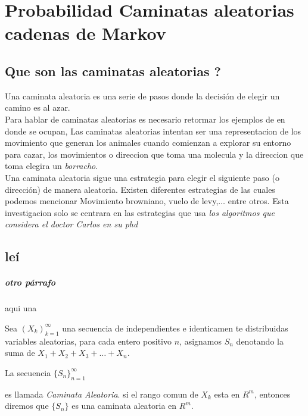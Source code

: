 \chapter{Probabilidad Caminatas aleatorias   cadenas de Markov} %
\label{Chapter1}


\section {Que son las caminatas aleatorias ?}
Una caminata aleatoria es una serie de pasos donde la decisi\'on de
elegir un
camino es al azar.\\
Para hablar de caminatas aleatorias es necesario retormar los ejemplos
de en donde se ocupan, Las caminatas aleatorias intentan ser una
representacion de los movimiento que generan los animales cuando
comienzan a explorar su entorno para cazar, los movimientos o
direccion que toma una molecula y la direccion que toma elegira un
\emph{borracho}.\\

Una caminata aleatoria sigue una estrategia para elegir el siguiente
paso (o direcci\'on) de manera aleatoria. Existen diferentes
estrategias de las cuales podemos mencionar Movimiento browniano,
vuelo de levy,$ \ldots$  entre otros. Esta
investigacion solo se centrara en las estrategias que usa \emph{los
  algoritmos
  que considera el doctor Carlos en su phd } \\


\section{leí}

\paragraph{otro párrafo}






aqui una 
\begin{define}
  Sea $ (X_k )_{k=1}^\infty$
  una secuencia de independientes e identicamen
  te distribuidas variables aleatorias, para cada entero positivo $n$, asignamos
  $S_n$ denotando la suma de $X_1 + X_2 + X_3 + \ldots + X_n  $.

 La secuencia
$ \{ S_n \}_{n = 1}^\infty$


es llamada \emph{Caminata Aleatoria}. si el rango comun de
$X_k$ esta en $R^m$, entonces diremos que $\{S_n\}$ es una caminata aleatoria en $R^m$.
\end{define}

